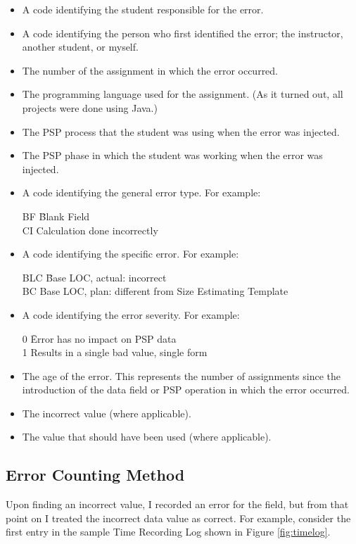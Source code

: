 \begin{itemize}
\item A code identifying the student responsible for the error.
\item A code identifying the person who first identified the error;
the instructor, another student, or myself.
\item The number of the assignment in which the error occurred.
\item The programming language used for the assignment.  (As it turned out, 
      all projects were done using Java.)
\item The PSP process that the student was using when the error was
      injected.
\item The PSP phase in which the student was working when the error was
      injected.
\item A code identifying the general error type.  For example: 
      \begin{tabbing}
      BF  \quad\= Blank Field\quad\\ 
      CI  \>Calculation done incorrectly
      \end{tabbing}
\item A code identifying the specific error. For example:
      \begin{tabbing}
      BLC \quad\= Base LOC, actual: incorrect\quad\\ 
      BC  \>Base LOC, plan:   different from Size Estimating Template
      \end{tabbing}
\item A code identifying the error severity. For example: 
      \begin{tabbing}
      0   \quad\= Error has no impact on PSP data\quad\\
      1   \>Results in a single bad value, single form
      \end{tabbing}
\item The age of the error.  This represents the number of assignments 
      since the introduction of the data field or PSP operation in which the
      error occurred.
\item The incorrect value (where applicable).
\item The value that should have been used (where applicable).
\end{itemize} 

\subsection{Error Counting Method} \label{sec:error}
Upon finding an incorrect value, I recorded an error for the field, but
from that point on I treated the incorrect data value as correct.  For
example, consider the first entry in the sample Time Recording Log shown in
Figure \ref{fig:timelog}.

